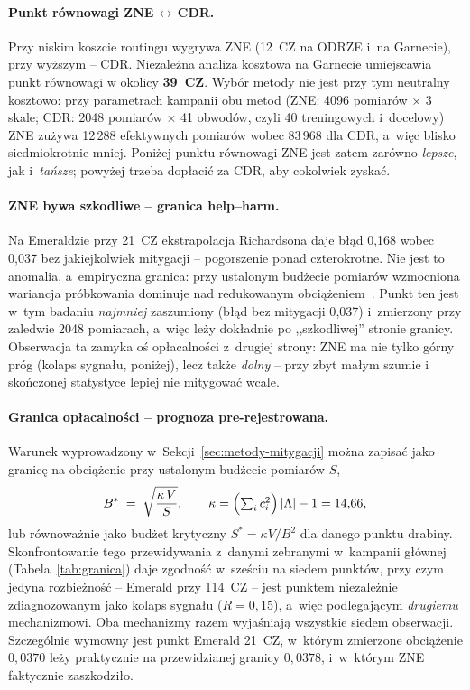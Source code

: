 \documentclass[11pt]{article}
\begin{document}
\paragraph{Punkt równowagi ZNE\,$\leftrightarrow$\,CDR.} Przy niskim koszcie routingu wygrywa ZNE
(12~CZ na ODRZE i~na Garnecie), przy wyższym -- CDR. Niezależna analiza kosztowa na Garnecie
umiejscawia punkt równowagi w okolicy \textbf{39~CZ}. Wybór metody nie jest przy tym neutralny
kosztowo: przy parametrach kampanii obu metod (ZNE: 4096 pomiarów $\times$ 3 skale; CDR: 2048
pomiarów $\times$ 41 obwodów, czyli 40 treningowych i~docelowy) ZNE zużywa 12\,288 efektywnych
pomiarów wobec 83\,968 dla CDR, a~więc blisko siedmiokrotnie mniej. Poniżej punktu równowagi ZNE jest zatem zarówno \emph{lepsze},
jak i~\emph{tańsze}; powyżej trzeba dopłacić za CDR, aby cokolwiek zyskać.

\paragraph{ZNE bywa szkodliwe -- granica help--harm.} Na Emeraldzie przy 21~CZ ekstrapolacja
Richardsona daje błąd 0{,}168 wobec 0{,}037 bez jakiejkolwiek mitygacji -- pogorszenie ponad
czterokrotne. Nie jest to anomalia, a~empiryczna granica: przy ustalonym budżecie pomiarów wzmocniona
wariancja próbkowania dominuje nad redukowanym obciążeniem~\cite{alfaro2026}. Punkt
ten jest w~tym badaniu \emph{najmniej} zaszumiony (błąd bez mitygacji 0{,}037) i~zmierzony przy
zaledwie 2048 pomiarach, a~więc leży dokładnie po ,,szkodliwej'' stronie granicy. Obserwacja ta
zamyka oś opłacalności z~drugiej strony: ZNE ma nie tylko górny próg (kolaps sygnału, poniżej), lecz
także \emph{dolny} -- przy zbyt małym szumie i skończonej statystyce lepiej nie mitygować wcale.

\paragraph{Granica opłacalności -- prognoza pre-rejestrowana.} Warunek wyprowadzony
w~Sekcji~\ref{sec:metody-mitygacji} można zapisać jako granicę na obciążenie przy ustalonym budżecie
pomiarów $S$,
\begin{equation}
  B^{*} \;=\; \sqrt{\frac{\kappa\,V}{S}}, \qquad
  \kappa = \Bigl(\textstyle\sum_i c_i^2\Bigr)\,|\Lambda| - 1 = 14{,}66 ,
  \label{eq:granica}
\end{equation}
lub równoważnie jako budżet krytyczny $S^{*} = \kappa V / B^2$ dla danego punktu drabiny. Skonfrontowanie
tego przewidywania z~danymi zebranymi w~kampanii głównej (Tabela~\ref{tab:granica}) daje zgodność
w~sześciu na siedem punktów, przy czym jedyna rozbieżność -- Emerald przy 114~CZ -- jest punktem
niezależnie zdiagnozowanym jako kolaps sygnału ($R=0{,}15$), a~więc podlegającym \emph{drugiemu}
mechanizmowi. Oba mechanizmy razem wyjaśniają wszystkie siedem obserwacji. Szczególnie wymowny jest
punkt Emerald 21~CZ, w~którym zmierzone obciążenie $0{,}0370$ leży praktycznie na przewidzianej
granicy $0{,}0378$, i~w~którym ZNE faktycznie zaszkodziło.
\end{document}

